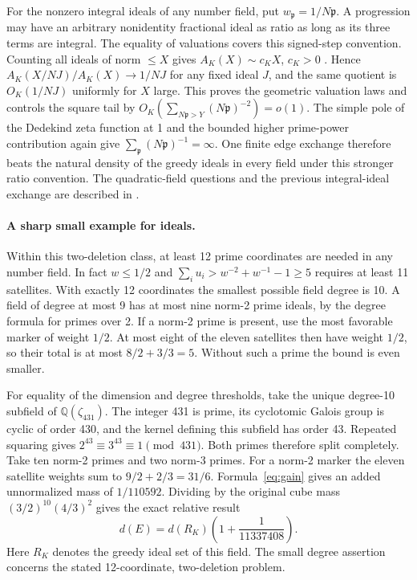For the nonzero integral ideals of any number field, put $w_{\mathfrak p}=1/N\mathfrak p$. A progression may have an arbitrary nonidentity fractional ideal as ratio as long as its three terms are integral. The equality of valuations covers this signed-step convention. Counting all ideals of norm $\le X$ gives $A_K(X)\sim c_KX$, $c_K>0$ \cite{idealcount}. Hence $A_K(X/NJ)/A_K(X)\to 1/NJ$ for any fixed ideal $J$, and the same quotient is $O_K(1/NJ)$ uniformly for $X$ large. This proves the geometric valuation laws and controls the square tail by $O_K(\sum_{N\mathfrak p>Y}(N\mathfrak p)^{-2})=o(1)$. The simple pole of the Dedekind zeta function at 1 and the bounded higher prime-power contribution again give $\sum_{\mathfrak p}(N\mathfrak p)^{-1}=\infty$. One finite edge exchange therefore beats the natural density of the greedy ideals in every field under this stronger ratio convention. The quadratic-field questions and the previous integral-ideal exchange are described in \cite{best,priorideal}.

\paragraph{A sharp small example for ideals.}
Within this two-deletion class, at least 12 prime coordinates are needed in any number field. In fact $w\le1/2$ and $\sum_i u_i> w^{-2}+w^{-1}-1\ge5$ requires at least 11 satellites. With exactly 12 coordinates the smallest possible field degree is 10. A field of degree at most 9 has at most nine norm-2 prime ideals, by the degree formula for primes over 2. If a norm-2 prime is present, use the most favorable marker of weight $1/2$. At most eight of the eleven satellites then have weight $1/2$, so their total is at most $8/2+3/3=5$. Without such a prime the bound is even smaller.

For equality of the dimension and degree thresholds, take the unique degree-10 subfield of $\mathbb Q(\zeta_{431})$. The integer 431 is prime, its cyclotomic Galois group is cyclic of order 430, and the kernel defining this subfield has order 43. Repeated squaring gives $2^{43}\equiv3^{43}\equiv1\pmod {431}$. Both primes therefore split completely. Take ten norm-2 primes and two norm-3 primes. For a norm-2 marker the eleven satellite weights sum to $9/2+2/3=31/6$. Formula~\eqref{eq:gain} gives an added unnormalized mass of $1/110592$. Dividing by the original cube mass $(3/2)^{10}(4/3)^2$ gives the exact relative result
\[
                 d(E)=d(R_K)\left(1+\frac1{11337408}\right).
\]
Here $R_K$ denotes the greedy ideal set of this field. The small degree assertion concerns the stated 12-coordinate, two-deletion problem.

